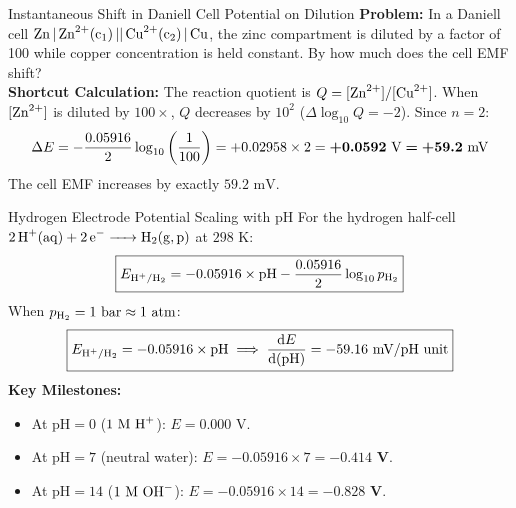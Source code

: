 \documentclass[11pt,a4paper]{report}
\newcommand{\diff}{\mathrm{d}}
\newcommand{\ans}[1]{\ifmmode\bm{#1}\else\textbf{#1}\fi}
\begin{document}
\begin{microbox}{Instantaneous Shift in Daniell Cell Potential on Dilution}
\textbf{Problem:} In a Daniell cell $\ce{Zn | Zn^{2+}(c_1) || Cu^{2+}(c_2) | Cu}$, the zinc compartment is diluted by a factor of 100 while copper concentration is held constant. By how much does the cell EMF shift?\\
\textbf{Shortcut Calculation:}
The reaction quotient is $Q = [\ce{Zn^{2+}}]/[\ce{Cu^{2+}}]$. When $[\ce{Zn^{2+}}]$ is diluted by $100\times$, $Q$ decreases by $10^2$ ($\Delta \log_{10} Q = -2$).
Since $n = 2$:
$$\Delta E = -\frac{0.05916}{2}\log_{10}\left(\frac{1}{100}\right) = +0.02958 \times 2 = \ans{+0.0592\text{ V} = +59.2\text{ mV}}$$
The cell EMF increases by exactly $59.2\text{ mV}$.
\end{microbox}

\begin{shortcutbox}{Hydrogen Electrode Potential Scaling with pH}
For the hydrogen half-cell $\ce{2H+(aq) + 2e^- -> H2(g, p)}$ at $298\text{ K}$:
\begin{equation}
\boxed{
E_{\ce{H+/H2}} = -0.05916 \times \mathrm{pH} - \frac{0.05916}{2}\log_{10} p_{\ce{H2}}
}
\end{equation}
When $p_{\ce{H2}} = 1\text{ bar} \approx 1\text{ atm}$:
\begin{equation}
\boxed{
E_{\ce{H+/H2}} = -0.05916 \times \mathrm{pH} \implies \frac{\diff E}{\diff(\mathrm{pH})} = -59.16\text{ mV/pH unit}
}
\end{equation}
\textbf{Key Milestones:}
\begin{itemize}
    \item At $\mathrm{pH} = 0$ ($1\text{ M }\ce{H+}$): $E = 0.000\text{ V}$.
    \item At $\mathrm{pH} = 7$ (neutral water): $E = -0.05916 \times 7 = \bm{-0.414\text{ V}}$.
    \item At $\mathrm{pH} = 14$ ($1\text{ M }\ce{OH-}$): $E = -0.05916 \times 14 = \bm{-0.828\text{ V}}$.
\end{itemize}
\end{shortcutbox}
\end{document}
